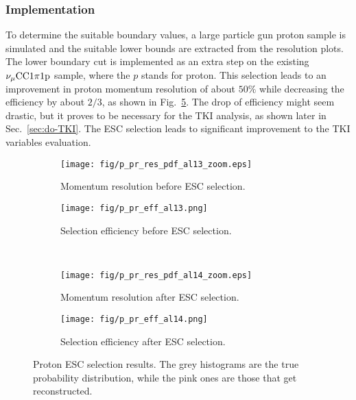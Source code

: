         \subsubsection{Implementation}
        To determine the suitable boundary values, a large particle gun proton sample is simulated and the suitable lower bounds are extracted from the resolution plots. %
        The lower boundary cut is implemented as an extra step on the existing $\nu_{\mu}\textrm{CC}1\pi1\textrm{p}$ sample, where the $p$ stands for proton.
        This selection leads to an improvement in proton momentum resolution of about $50\%$ while decreasing the efficiency by about $2/3$, as shown in Fig.~\ref{fig:pprESC-res}.   
        The drop of efficiency might seem drastic, but it proves to be necessary for the TKI analysis, as shown later in Sec.~\ref{sec:do-TKI}. The ESC selection leads to significant improvement to the TKI variables evaluation. 

        \begin{figure}[t]
           \centering
           \begin{subfigure}{0.45\textwidth}
                \texttt{[image: fig/p\_pr\_res\_pdf\_al13\_zoom.eps]}
                \caption{Momentum resolution before ESC selection.}
                \label{fig:ppr-res-bfESC}
           \end{subfigure}
           \begin{subfigure}{0.45\textwidth}
                \texttt{[image: fig/p\_pr\_eff\_al13.png]}
                \caption{Selection efficiency before ESC selection.}
                \label{fig:ppr-eff-bfESC}
           \end{subfigure}
           \\
           \begin{subfigure}{0.45\textwidth}
                \texttt{[image: fig/p\_pr\_res\_pdf\_al14\_zoom.eps]}
                \caption{Momentum resolution after ESC selection.}
                \label{fig:ppr-res-afESC}
           \end{subfigure}
           \begin{subfigure}{0.45\textwidth}
                \texttt{[image: fig/p\_pr\_eff\_al14.png]}
                \caption{Selection efficiency after ESC selection.}
                \label{fig:ppr-eff-afESC}
           \end{subfigure}
           \caption{Proton ESC selection results. The grey histograms are the true probability distribution, while the pink ones are those that get reconstructed. }
           \label{fig:pprESC-res}
        \end{figure}

